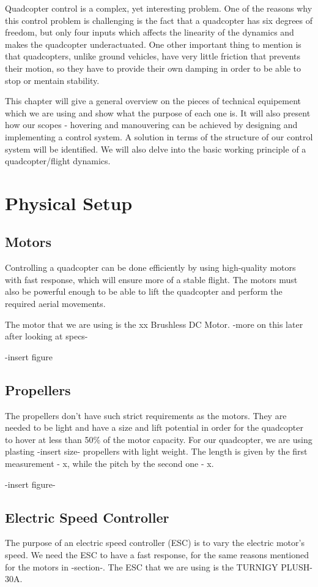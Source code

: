 Quadcopter control is a complex, yet interesting problem. One of the reasons why this control problem is challenging is the fact that a quadcopter has six degrees of freedom, but only four inputs which affects the linearity of the dynamics and makes the quadcopter underactuated. One other important thing to mention is that quadcopters, unlike ground vehicles, have very little friction that prevents their motion, so they have to provide their own damping in order to be able to stop or mentain stability.

This chapter will give a general overview on the pieces of technical equipement which we are using and show what the purpose of each one is. It will also present how our scopes - hovering and manouvering can be achieved by designing and implementing a control system. A solution in terms of the structure of our control system will be identified. We will also delve into the basic working principle of a quadcopter/flight dynamics.

\section{Physical Setup}
\subsection{Motors}
Controlling a quadcopter can be done efficiently by using high-quality motors with fast response, which will ensure more of a stable flight. The motors must also be powerful enough to be able to lift the quadcopter and perform the required aerial movements. 

The motor that we are using is the xx Brushless DC Motor. -more on this later after looking at specs-

-insert figure

\subsection{Propellers}
The propellers don't have such strict requirements as the motors. They are needed to be light and have a size and lift potential in order for the quadcopter to hover at less than 50\% of the motor capacity. For our quadcopter, we are using plasting -insert size- propellers with light weight. The length is given by the first measurement - x, while the pitch by the second one - x.

-insert figure-

\subsection{Electric Speed Controller}
The purpose of an electric speed controller (ESC) is to vary the electric motor's speed. We need the ESC to have a fast response, for the same reasons mentioned for the motors in -section-. The ESC that we are using is the TURNIGY PLUSH-30A.

